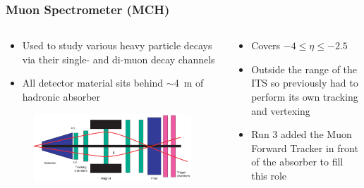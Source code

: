 \documentclass[10pt]{beamer}
\begin{document}
\begin{frame}
    \frametitle{Muon Spectrometer (MCH)}

    \begin{columns}[t]
        \begin{column}{0.6\textwidth}
            \begin{itemize}
                \item Used to study various heavy particle decays via their single- and di-muon decay channels
                \item All detector material sits behind $\sim$\SI{4}{\metre} of hadronic absorber
            \end{itemize}
            \begin{figure}[h]
                \begin{center}
                    \includegraphics[width=\textwidth]{Figs/MCH_schematic.png}
                \end{center}
            \end{figure}
        \end{column}

        \begin{column}{0.4\textwidth}
            \begin{itemize}
                \item Covers $-4\leq\eta\leq -2.5$
                \item Outside the range of the ITS so previously had to perform its own tracking and vertexing
                \item Run 3 added the Muon Forward Tracker in front of the absorber to fill this role
            \end{itemize}
        \end{column}
    \end{columns}

\end{frame}
\end{document}
